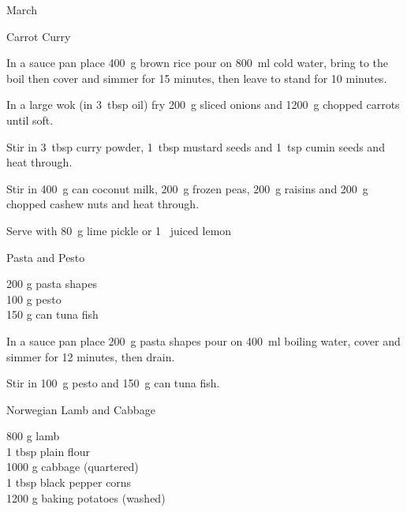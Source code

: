 \begin{menu}{March}
\begin{recipe}{2}{Carrot Curry}
    \begin{instructions}
    \item 
    In a
    sauce pan
    place
    400~g  brown rice
    pour on
    800~ml  cold water,
    bring to the boil then cover and simmer for 15 minutes,
    then leave to stand for 10 minutes.
  \item 
        In a large wok
        (in 3~tbsp  oil)
        fry
        200~g sliced onions
        and
        1200~g chopped carrots
        until soft.
      \item 
        Stir in
        3~tbsp  curry powder,
        1~tbsp  mustard seeds
        and
        1~tsp  cumin seeds
        and heat through.
      \item 
        Stir in
        400~g  can coconut milk,
        200~g  frozen peas,
        200~g  raisins
        and
        200~g chopped cashew nuts
        and heat through.
      \item 
        Serve with 80~g  lime pickle
        or
        1~ juiced lemon
    \end{instructions}
    \end{recipe}%
  
    \begin{recipe}{1}{Pasta and Pesto}%
		\begin{ingredients}
		200 g pasta shapes  \\
	100 g pesto  \\
	150 g can tuna fish  \\
	
		\end{ingredients}
	
	
    \begin{instructions}
    \item 
    In a
    sauce pan
    place
    200~g  pasta shapes
    pour on
    400~ml  boiling water,
    cover and simmer for 12 minutes, then drain.
  \item 
        Stir in
        100~g  pesto and
        150~g  can tuna fish.
      
    \end{instructions}
    \end{recipe}%
  
    \begin{recipe}{2}{Norwegian Lamb and Cabbage}%
		\begin{ingredients}
		800 g lamb  \\
	1 tbsp plain flour  \\
	1000 g cabbage (quartered) \\
	1 tbsp black pepper corns  \\
	1200 g baking potatoes (washed) \\
	

\end{ingredients}
\end{recipe}
\end{menu}
